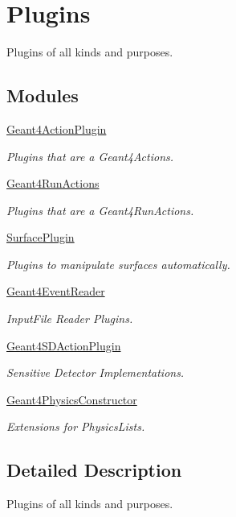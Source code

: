 \hypertarget{group___plugins}{}\section{Plugins}
\label{group___plugins}


Plugins of all kinds and purposes.  


\subsection*{Modules}
\begin{DoxyCompactItemize}
\item 
\hyperlink{group___geant4_action_plugin}{Geant4\+Action\+Plugin}
\begin{DoxyCompactList}\small\item\em Plugins that are a Geant4\+Actions. \end{DoxyCompactList}\item 
\hyperlink{group___geant4_run_actions}{Geant4\+Run\+Actions}
\begin{DoxyCompactList}\small\item\em Plugins that are a Geant4\+Run\+Actions. \end{DoxyCompactList}\item 
\hyperlink{group___surface_plugin}{Surface\+Plugin}
\begin{DoxyCompactList}\small\item\em Plugins to manipulate surfaces automatically. \end{DoxyCompactList}\item 
\hyperlink{group___geant4_event_reader}{Geant4\+Event\+Reader}
\begin{DoxyCompactList}\small\item\em Input\+File Reader Plugins. \end{DoxyCompactList}\item 
\hyperlink{group___geant4_s_d_action_plugin}{Geant4\+S\+D\+Action\+Plugin}
\begin{DoxyCompactList}\small\item\em Sensitive Detector Implementations. \end{DoxyCompactList}\item 
\hyperlink{group___geant4_physics_constructor}{Geant4\+Physics\+Constructor}
\begin{DoxyCompactList}\small\item\em Extensions for Physics\+Lists. \end{DoxyCompactList}\end{DoxyCompactItemize}


\subsection{Detailed Description}
Plugins of all kinds and purposes. 

